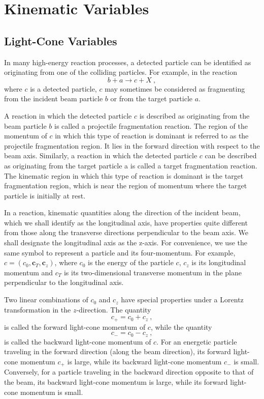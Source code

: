 \documentclass[11pt,a4paper]{article}
\renewcommand{\vec}[1]{\boldsymbol{#1}}
\begin{document}
\section{Kinematic Variables}

\subsection{Light-Cone Variables}
\cite{cheuk1994introduction} In many high-energy reaction processes, a detected particle can be identified as originating from one of the colliding particles. For example, in the reaction
\begin{equation}
b+a \rightarrow c +X ~,
\end{equation}
where $c$ is a detected particle, $c$ may sometimes be considered as fragmenting from the incident beam particle $b$ or from the target particle $a$.

A reaction in which the detected particle $c$ is described as originating from the beam particle $b$ is called a projectile fragmentation reaction. The region of the momentum of $c$ in which this type of reaction is dominant is referred to as the projectile fragmentation region. It lies in the forward direction with respect to the beam axis. Similarly, a reaction in which the detected particle $c$ can be described as originating from the target particle a is called a target fragmentation reaction. The kinematic region in which this type of reaction is dominant is the target fragmentation region, which is near the region of momentum where the target particle is initially at rest. 

In a reaction, kinematic quantities along the direction of the incident beam, which we shall identify as the longitudinal axis, have properties quite different from those along the transverse directions perpendicular to the beam axis. We shall designate the longitudinal axis as the z-axis. For convenience, we use the same symbol to represent a particle and its four-momentum. For example, $c = (c_0, \vec{c}_T, \vec{c}_z)$, where $c_0$ is the energy of the particle $c$, $c_z$ is its longitudinal momentum and $c_T$ is its two-dimensional transverse momentum in the plane perpendicular to the longitudinal axis. 

Two linear combinations of $c_0$ and $c_z$ have special properties under a Lorentz transformation in the $z$-direction. The quantity
\begin{equation}
c_+ = c_0 +c_z ~,
\end{equation}
is called the forward light-cone momentum of $c$, while the quantity
\begin{equation}
c_- = c_0 -c_z ~,
\end{equation}
is called the backward light-cone momentum of $c$. For an energetic particle traveling in the forward direction (along the beam direction), its forward light-cone momentum $c_+$ is large, while its backward light-cone momentum $c_-$ is small. Conversely, for a particle traveling in the backward direction opposite to that of the beam, its backward light-cone momentum is large, while its forward light-cone momentum is small.
\end{document}

